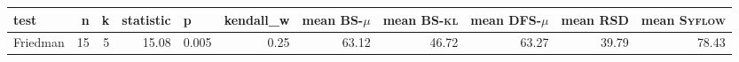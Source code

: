\begin{tabular}{lrrrlrrrrrr}
\toprule
    test &  n &  k &  statistic &     p &  kendall\_w &  mean \textsc{BS-$\mu$} &  mean \textsc{BS-kl} &  mean \textsc{DFS-$\mu$} &  mean \textsc{RSD} &  mean \textsc{Syflow} \\
\midrule
Friedman & 15 &  5 &      15.08 & 0.005 &        0.25 &                   63.12 &                46.72 &                    63.27 &              39.79 &                 78.43 \\
\bottomrule
\end{tabular}
